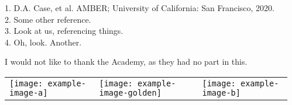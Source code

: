 \documentclass[20pt]{beamer}
\newlength{\sepwidth}
\newlength{\colwidth}
\newcommand{\separatorcolumn}{\begin{column}{\sepwidth}\end{column}}
\newlength{\smallcolwidth}
\begin{document}
\begin{frame}[t]
\begin{columns}[t]
\begin{column}{\smallcolwidth}
\begin{tcolorbox}[title=Etwas Anderes, every float=\centering]
\end{tcolorbox}


\begin{tcolorbox}[title=References, fonttitle=\bfseries\small]
\small
1. D.A. Case, et al. AMBER; University of California: San Francisco, 2020. \\
2. Some other reference. \\
3. Look at us, referencing things. \\
4. Oh, look. Another.
\end{tcolorbox}

\begin{tcolorbox}[title=Acknowledgements, fonttitle=\bfseries\small]
\small I would not like to thank the Academy, as they had no part in this. \\[1ex]

\begin{center}
\begin{tabular}{ m{0.3\colwidth} m{0.3\colwidth} m{0.3\colwidth} }
\texttt{[image: example-image-a]} & \texttt{[image: example-image-golden]} & \texttt{[image: example-image-b]} \\
\end{tabular}
\end{center}

\end{tcolorbox}

\end{column}
\separatorcolumn
\end{columns}

\end{frame}
\end{document}
